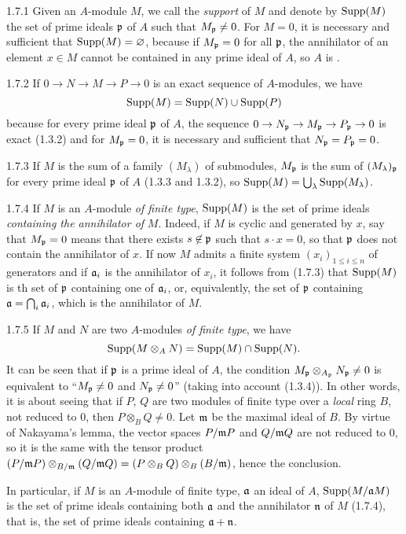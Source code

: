 \documentclass[../main.tex]{subfiles}
\begin{document}
\begin{cx}{1.7.1}
Given an $A$-module $M$, we call the \emph{support} of $M$ and denote by $\operatorname*{Supp}(M)$
the set of prime ideals $\mathfrak{p}$ of $A$ such that $M_\mathfrak{p}\neq 0$. For $M=0$, it
is necessary and sufficient that $\operatorname*{Supp}(M)=\varnothing$, because if $M_\mathfrak{p}=0$ for all
$\mathfrak{p}$, the annihilator of an element $x\in M$ cannot be contained in any prime
ideal of $A$, so $A$ is .
\end{cx}

\begin{cx}{1.7.2}
If $0\to N\to M\to P\to 0$ is an exact sequence of $A$-modules, we have
\[
  \operatorname*{Supp}(M)=\operatorname*{Supp}(N)\cup\operatorname*{Supp}(P)
\]
because for every prime ideal $\mathfrak{p}$ of $A$, the sequence
${0\to N_\mathfrak{p}\to M_\mathfrak{p}\to P_\mathfrak{p}\to 0}$ is exact (1.3.2) and for
$M_\mathfrak{p}=0$, it is necessary and sufficient that $N_\mathfrak{p}=P_\mathfrak{p}=0$.
\end{cx}

\begin{cx}{1.7.3}
If $M$ is the sum of a family $(M_\lambda)$ of submodules, $M_\mathfrak{p}$ is the sum
of $(M_\lambda)_\mathfrak{p}$ for every prime ideal $\mathfrak{p}$ of $A$ (1.3.3 and 1.3.2),
so $\operatorname*{Supp}(M)=\bigcup_\lambda\operatorname*{Supp}(M_\lambda)$.
\end{cx}

\begin{cx}{1.7.4}
If $M$ is an $A$-module \emph{of finite type}, $\operatorname*{Supp}(M)$ is the set of prime
ideals \emph{containing the annihilator of} $M$. Indeed, if $M$ is cyclic and
generated by $x$, say that $M_\mathfrak{p}=0$ means that there exists $s\not\in\mathfrak{p}$
such that $s\cdot x=0$, so that $\mathfrak{p}$ does not contain the annihilator of $x$.
If now $M$ admits a finite system $(x_i)_{1\leq i\leq n}$ of generators and if
$\mathfrak{a}_i$ is the annihilator of $x_i$, it follows from (1.7.3) that $\operatorname*{Supp}(M)$
is th set of $\mathfrak{p}$ containing one of $\mathfrak{a}_i$, or, equivalently, the
set of $\mathfrak{p}$ containing $\mathfrak{a}=\bigcap_i\mathfrak{a}_i$, which is the annihilator
of $M$.
\end{cx}

\begin{cx}{1.7.5}
If $M$ and $N$ are two $A$-modules \emph{of finite type}, we have
\[
  \operatorname*{Supp}(M\otimes_A N)=\operatorname*{Supp}(M)\cap\operatorname*{Supp}(N).
\]
It can be seen that if $\mathfrak{p}$ is a prime ideal of $A$, the condition
$M_\mathfrak{p}\otimes_{A_\mathfrak{p}}N_\mathfrak{p}\neq 0$ is equivalent to
``$M_\mathfrak{p}\neq 0$ and $N_\mathfrak{p}\neq 0$'' (taking into account (1.3.4)). In
other words, it is about seeing that if $P$, $Q$ are two modules of finite type
over a \emph{local} ring $B$, not reduced to $0$, then $P\otimes_B Q\neq 0$. Let
$\mathfrak{m}$ be the maximal ideal of $B$. By virtue of Nakayama's lemma, the vector
spaces $P/\mathfrak{m}P$ and $Q/\mathfrak{m}Q$ are not reduced to $0$, so it is the same with
the tensor product
$(P/\mathfrak{m}P)\otimes_{B/\mathfrak{m}}(Q/\mathfrak{m}Q)=(P\otimes_B Q)\otimes_B(B/\mathfrak{m})$,
hence the conclusion.

In particular, if $M$ is an $A$-module of finite type, $\mathfrak{a}$ an ideal of $A$,
$\operatorname*{Supp}(M/\mathfrak{a}M)$ is the set of prime ideals containing both $\mathfrak{a}$ and the
annihilator $\mathfrak{n}$ of $M$ (1.7.4), that is, the set of prime ideals containing
$\mathfrak{a}+\mathfrak{n}$.
\end{cx}
\end{document}
